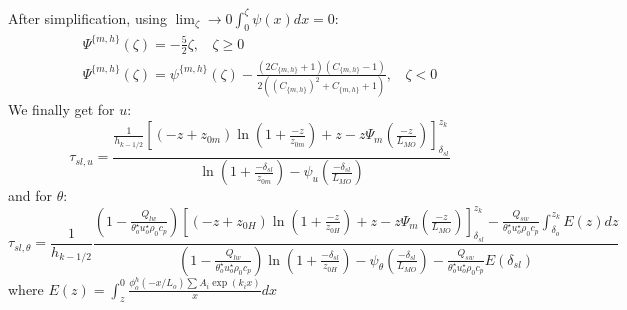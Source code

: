 After simplification, using $\lim_\zeta\to0 \int_0^\zeta\psi(x)dx = 0$:
\begin{equation}
\begin{aligned}
\Psi^{\{m,h\}}(\zeta)= -\frac{5}{2}\zeta, ~~~~ \zeta \geq 0 \\
	\Psi^{\{m,h\}}(\zeta)=
	\psi^{\{m,h\}}(\zeta)
	- \frac{(2C_{\{m,h\}}+1)(C_{\{m,h\}} - 1)}
	{2\left((C_{\{m,h\}})^2 + C_{\{m,h\}} + 1\right)}, ~~~~ \zeta < 0
\end{aligned}
\end{equation}
We finally get for $u$:
\begin{equation}
	\tau_{sl, u} = \frac{\frac{1}{{h_{k-1/2}}}
    \left[
	    (-z+z_{0m})\ln(1+\frac{-z}{z_{0m}})+z
    -
    z \Psi_m(\frac{-z}{L_{MO}}) \right]_{\delta_{sl}}^{z_k}
    }{\ln(1+\frac{-\delta_{sl}}{z_{0m}})- \psi_u(\frac{-\delta_{sl}}{L_{MO}})
    }
\end{equation}
and for $\theta$:
\begin{equation}
	\tau_{sl, \theta} =  \frac{1}{{h_{k-1/2}}}\frac{(1 -
		\frac{Q_{lw}}{\theta_o^{\star}u_o^{\star}\rho_0 c_p})
    \left[
	    (-z+z_{0H})\ln(1+\frac{-z}{z_{0H}})+z
    -
    z \Psi_m(\frac{-z}{L_{MO}}) \right]_{\delta_{sl}}^{z_k}
	- \frac{Q_{sw}}{\theta_o^{\star}u_o^{\star}\rho_0 c_p}
	\int_{\delta_o}^{z_k}
		E(z) dz
    }{(1 - \frac{Q_{lw}}{\theta_o^{\star}u_o^{\star}\rho_0 c_p})
	    \ln(1+\frac{-\delta_{sl}}{z_{0H}})- \psi_\theta(\frac{-\delta_{sl}}{L_{MO}})
	    -\frac{Q_{sw}}{\theta_o^{\star}u_o^{\star}\rho_0 c_p} E(\delta_{sl})
    }
\end{equation}
where $E(z) = \int_{z}^0 \frac{\phi^h_o(-x/L_o)
		\sum A_i \exp (k_i x)
		}{x}dx$



